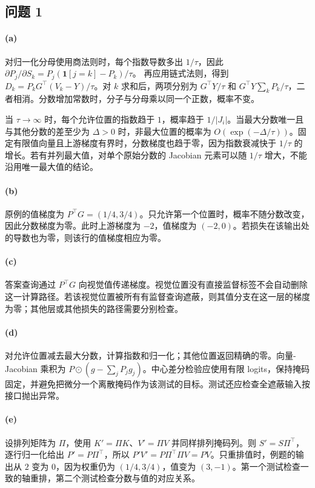 \subsection*{问题 1}
\paragraph{(a)}\label{sol:att-a}
对归一化分母使用商法则时，每个指数导数多出 $1/\tau$，因此
$\partial P_j/\partial S_k=P_j(\mathbf1[j=k]-P_k)/\tau$。
再应用链式法则，得到 $D_k=P_kG^\top(V_k-Y)/\tau$。对 $k$ 求和后，两项分别为 $G^\top Y/\tau$ 和 $G^\top Y\sum_kP_k/\tau$，二者相消。分数增加常数时，分子与分母乘以同一个正数，概率不变。

当 $\tau\to\infty$ 时，每个允许位置的指数趋于 $1$，概率趋于 $1/|J_i|$。当最大分数唯一且与其他分数的差至少为 $\Delta>0$ 时，非最大位置的概率为 $O(\exp(-\Delta/\tau))$。固定有限值向量且上游梯度有界时，分数梯度也趋于零，因为指数衰减快于 $1/\tau$ 的增长。若有并列最大值，对单个原始分数的 Jacobian 元素可以随 $1/\tau$ 增大，不能沿用唯一最大值的结论。

\paragraph{(b)}\label{sol:att-b}
原例的值梯度为 $P^\top G=(1/4,3/4)$。只允许第一个位置时，概率不随分数改变，因此分数梯度为零。此时上游梯度为 $-2$，值梯度为 $(-2,0)$。若损失在该输出处的导数也为零，则该行的值梯度相应为零。

\paragraph{(c)}\label{sol:att-c}
答案查询通过 $P^\top G$ 向视觉值传递梯度。视觉位置没有直接监督标签不会自动删除这一计算路径。若该视觉位置被所有有监督查询遮蔽，则其值分支在这一层的梯度为零；其他层或其他损失的路径需要分别检查。

\paragraph{(d)}\label{sol:att-d}
对允许位置减去最大分数，计算指数和归一化；其他位置返回精确的零。向量-Jacobian 乘积为 $P\odot(g-\sum_jP_jg_j)$。中心差分检验应使用有限 logits，保持掩码固定，并避免把微分一个离散掩码作为该测试的目标。测试还应检查全遮蔽输入按接口抛出异常。

\paragraph{(e)}\label{sol:att-e}
设排列矩阵为 $\Pi$，使用 $K'=\Pi K$、$V'=\Pi V$ 并同样排列掩码列。则 $S'=S\Pi^\top$，逐行归一化给出 $P'=P\Pi^\top$，所以 $P'V'=P\Pi^\top\Pi V=PV$。只重排值时，例题的输出从 $2$ 变为 $0$，因为权重仍为 $(1/4,3/4)$，值变为 $(3,-1)$。第一个测试检查一致的轴重排，第二个测试检查分数与值的对应关系。

